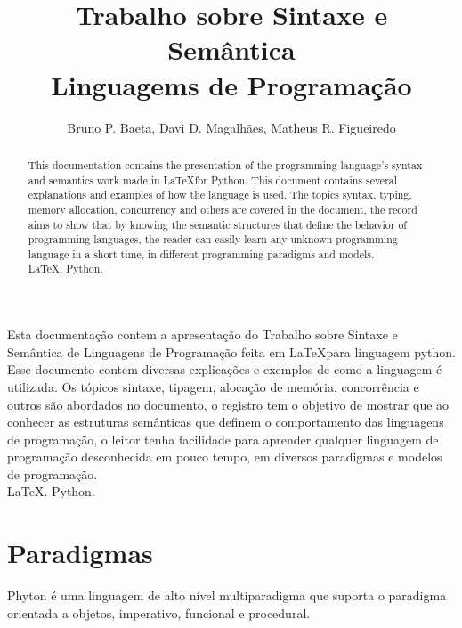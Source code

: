 \documentclass[12pt]{article}
\title{Trabalho sobre Sintaxe e Semântica\\ Linguagems de Programação}
\author{Bruno P. Baeta\inst{1}, Davi D. Magalhães\inst{2}, Matheus R. Figueiredo\inst{3} }
\begin{document}
 
\maketitle



\begin{abstract}
This documentation contains the presentation of the programming language's syntax and semantics work  made in \LaTeX for Python. This document contains several explanations and examples of how the language is used. The topics syntax, typing, memory allocation, concurrency and others are covered in the document, the record aims to show that by knowing the semantic structures that define the behavior of programming languages, the reader can easily learn any unknown programming language in a short time, in different programming paradigms and models.
\\\textbf{}\LaTeX. Python.
\end{abstract}




\begin{resumo} 
Esta documentação contem a apresentação do Trabalho sobre Sintaxe e Semântica de Linguagens de Programação feita em \LaTeX para linguagem python. Esse documento contem diversas explicações e exemplos de como a linguagem é utilizada. Os tópicos sintaxe, tipagem, alocação de memória, concorrência e outros são abordados no documento, o registro tem o objetivo de mostrar que ao conhecer as estruturas semânticas que definem o comportamento das linguagens de programação, o leitor tenha facilidade para aprender qualquer linguagem de programação desconhecida em pouco tempo, em diversos paradigmas e modelos de programação.
  \\\textbf{}\LaTeX. Python.
\end{resumo}




\section{Paradigmas}
Phyton é uma linguagem de alto nível multiparadigma que suporta o paradigma orientada a objetos, imperativo, funcional e procedural.
\end{document}
